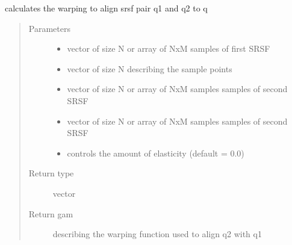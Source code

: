 \documentclass[letterpaper,10pt,english]{sphinxmanual}
\begin{document}
\begin{fulllineitems}
\label{\detokenize{utility_functions:utility_functions.optimum_reparam_pair}}
calculates the warping to align srsf pair q1 and q2 to q
\begin{quote}\begin{description}
\item[{Parameters}] \leavevmode\begin{itemize}
\item {} 
 \textendash{} vector of size N or array of NxM samples of first SRSF

\item {} 
 \textendash{} vector of size N describing the sample points

\item {} 
 \textendash{} vector of size N or array of NxM samples samples of second SRSF

\item {} 
 \textendash{} vector of size N or array of NxM samples samples of second SRSF

\item {} 
 \textendash{} controls the amount of elasticity (default = 0.0)

\end{itemize}

\item[{Return type}] \leavevmode
vector

\item[{Return gam}] \leavevmode
describing the warping function used to align q2 with q1

\end{description}\end{quote}

\end{fulllineitems}

\end{document}
